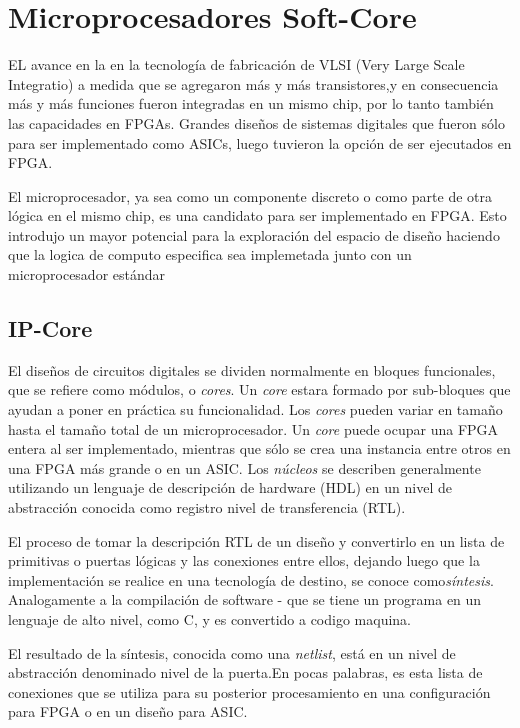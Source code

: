 \section{Microprocesadores Soft-Core}

EL avance en la en la tecnología de fabricación de VLSI (Very Large Scale Integratio) a medida que se agregaron más y más transistores,y en consecuencia más y más funciones fueron integradas en un mismo chip, por lo tanto también las capacidades en FPGAs. Grandes diseños de sistemas digitales que fueron sólo para ser implementado como ASICs, luego tuvieron la opción de ser ejecutados en FPGA.

El microprocesador, ya sea como un componente discreto o  como parte de otra lógica en el mismo chip, es una candidato  para ser  implementado en FPGA. Esto introdujo un mayor potencial para la exploración del espacio de diseño haciendo que la logica de computo especifica sea implemetada junto con un microprocesador estándar %
		
		\subsection{ IP-Core}

El diseños de circuitos digitales se dividen normalmente en bloques funcionales, que se refiere como módulos, o \textit{cores}. Un \textit{core} estara formado por sub-bloques que ayudan a poner en práctica su funcionalidad. Los \textit{cores} pueden variar en tamaño hasta el tamaño total de un microprocesador. Un \textit{core} puede ocupar una FPGA entera al ser implementado, mientras que sólo se crea una instancia entre otros en una FPGA más grande o en un ASIC. Los \textit{núcleos} se describen generalmente utilizando un lenguaje de descripción de hardware (HDL) en un nivel de abstracción conocida como registro nivel de transferencia (RTL).

El proceso de tomar la descripción RTL de un diseño y convertirlo en un lista de primitivas o puertas lógicas y las conexiones entre ellos, dejando luego que la  implementación se realice en una tecnología de destino, se conoce como\textit{síntesis}. Analogamente a la compilación de software - que se tiene un programa en un lenguaje de alto nivel, como C, y  es convertido a codigo maquina. 

El resultado de la síntesis, conocida como una \textit{netlist}, está en un nivel de abstracción denominado nivel de la puerta.En pocas palabras, es esta lista de conexiones que se utiliza para su posterior procesamiento en una configuración para FPGA o en un diseño para ASIC.

